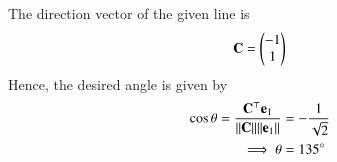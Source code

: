 The direction vector of the given line is 
\begin{align}
	\mathbf{C}
=\begin{pmatrix} -1\\ 1 \end{pmatrix}
\end{align}
Hence, the desired angle is given by
\begin{align}
	\cos\theta=\frac{\mathbf{C}^{\top}\mathbf{e}_1}{\lVert\mathbf{C}\rVert\lVert\mathbf{e}_1\rVert}
	&= -\frac{1}{\sqrt{2}}
	\\
	\implies 
	\theta&=135\degree
 \end{align}
